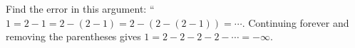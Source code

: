 Find the error in this argument: ``$1=2-1=2-(2-1)=2-(2-(2-1))=\cdots$. Continuing forever and removing the parentheses gives $1=2-2-2-2-\cdots=-\infty$.
